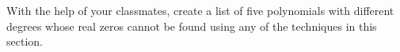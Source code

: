 {With the help of your classmates, create a list of five polynomials with different degrees whose real zeros cannot be found using any of the techniques in this section. }
{}